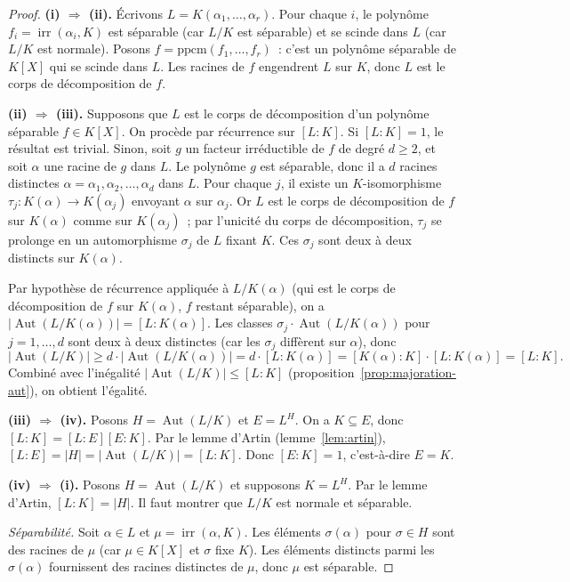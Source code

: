 \documentclass[12pt,a4paper,openany]{book}
\theoremstyle{definition}
\newcommand{\Aut}{\operatorname{Aut}}
\newcommand{\irr}{\operatorname{irr}}
\begin{document}
\begin{proof}
\textbf{(i) $\Rightarrow$ (ii).}
Écrivons $L = K(\alpha_1, \ldots, \alpha_r)$. Pour chaque $i$, le polynôme
$f_i = \irr(\alpha_i, K)$ est séparable (car $L/K$ est séparable) et se
scinde dans $L$ (car $L/K$ est normale). Posons $f = \mathrm{ppcm}(f_1,
\ldots, f_r)$~: c'est un polynôme séparable de $K[X]$ qui se scinde dans $L$.
Les racines de $f$ engendrent $L$ sur $K$, donc $L$ est le corps de
décomposition de $f$.

\medskip\noindent
\textbf{(ii) $\Rightarrow$ (iii).}
Supposons que $L$ est le corps de décomposition d'un polynôme séparable
$f \in K[X]$. On procède par récurrence sur $[L:K]$. Si $[L:K] = 1$, le
résultat est trivial. Sinon, soit $g$ un facteur irréductible de $f$ de
degré $d \geq 2$, et soit $\alpha$ une racine de $g$ dans $L$. Le polynôme
$g$ est séparable, donc il a $d$ racines distinctes $\alpha = \alpha_1,
\alpha_2, \ldots, \alpha_d$ dans $L$. Pour chaque $j$, il existe un
$K$-isomorphisme $\tau_j \colon K(\alpha) \to K(\alpha_j)$ envoyant $\alpha$
sur $\alpha_j$. Or $L$ est le corps de décomposition de $f$ sur $K(\alpha)$
comme sur $K(\alpha_j)$~; par l'unicité du corps de décomposition, $\tau_j$
se prolonge en un automorphisme $\sigma_j$ de $L$ fixant $K$. Ces $\sigma_j$
sont deux à deux distincts sur $K(\alpha)$.

Par hypothèse de récurrence appliquée à $L/K(\alpha)$ (qui est le corps de
décomposition de $f$ sur $K(\alpha)$, $f$ restant séparable), on a
$|\Aut(L/K(\alpha))| = [L:K(\alpha)]$. Les classes
$\sigma_j \cdot \Aut(L/K(\alpha))$ pour $j = 1, \ldots, d$ sont deux à deux
distinctes (car les $\sigma_j$ diffèrent sur $\alpha$), donc
\[
  |\Aut(L/K)| \geq d \cdot |\Aut(L/K(\alpha))| = d \cdot [L:K(\alpha)]
  = [K(\alpha):K] \cdot [L:K(\alpha)] = [L:K].
\]
Combiné avec l'inégalité $|\Aut(L/K)| \leq [L:K]$ (proposition~\ref{prop:majoration-aut}), on obtient l'égalité.

\medskip\noindent
\textbf{(iii) $\Rightarrow$ (iv).}
Posons $H = \Aut(L/K)$ et $E = L^H$. On a $K \subseteq E$, donc
$[L:K] = [L:E][E:K]$. Par le lemme d'Artin
(lemme~\ref{lem:artin}), $[L:E] = |H| = |\Aut(L/K)| = [L:K]$.
Donc $[E:K] = 1$, c'est-à-dire $E = K$.

\medskip\noindent
\textbf{(iv) $\Rightarrow$ (i).}
Posons $H = \Aut(L/K)$ et supposons $K = L^H$. Par le lemme d'Artin,
$[L:K] = |H|$. Il faut montrer que $L/K$ est normale et séparable.

\emph{Séparabilité.} Soit $\alpha \in L$ et $\mu = \irr(\alpha, K)$.
Les éléments $\sigma(\alpha)$ pour $\sigma \in H$ sont des racines de $\mu$
(car $\mu \in K[X]$ et $\sigma$ fixe $K$). Les éléments distincts parmi
les $\sigma(\alpha)$ fournissent des racines distinctes de $\mu$, donc
$\mu$ est séparable.


\end{proof}
\end{document}
